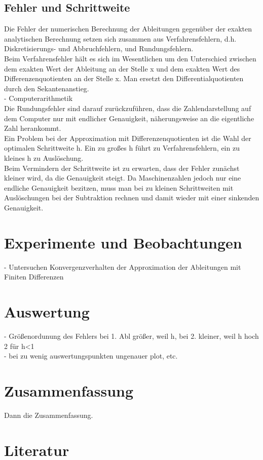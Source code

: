 \documentclass{scrartcl}
\begin{document}
\subsection{Fehler und Schrittweite}
\label{ssec:schrittweite}
Die Fehler der numerischen Berechnung der Ableitungen gegenüber der exakten analytischen Berechnung setzen sich zusammen aus Verfahrensfehlern, d.h. Diskretisierungs- und Abbruchfehlern, und Rundungsfehlern.\\
Beim Verfahrensfehler hält es sich im Wesentlichen um den Unterschied zwischen dem exakten Wert der Ableitung an der Stelle x und dem exakten Wert des Differenzenquotienten an der Stelle x. Man ersetzt den Differentialquotienten durch den Sekantenanstieg.\\
- Computerarithmetik\\
Die Rundungsfehler sind darauf zurückzuführen, dass die Zahlendarstellung auf dem Computer nur mit endlicher Genauigkeit, näherungsweise an die eigentliche Zahl herankommt. \\

Ein Problem bei der Approximation mit Differenzenquotienten ist die Wahl der optimalen Schrittweite h. Ein zu großes h führt zu Verfahrensfehlern, ein zu kleines h zu Auslöschung.\\
Beim Vermindern der Schrittweite ist zu erwarten, dass der Fehler zunächst kleiner wird, da die Genauigkeit steigt. Da Maschinenzahlen jedoch nur eine endliche Genauigkeit bezitzen, muss man bei zu kleinen Schrittweiten mit Auslöschungen bei der Subtraktion rechnen und damit wieder mit einer sinkenden Genauigkeit. \\

\pagebreak \section{Experimente und Beobachtungen}
\label{sec:experimente}
- Untersuchen Konvergenzverhalten der Approximation der Ableitungen mit Finiten Differenzen\\

\pagebreak \section{Auswertung}
\label{sec:auswertung}
- Größenordunung des Fehlers bei 1. Abl größer, weil h, bei 2. kleiner, weil h hoch 2 für h<1\\
- bei zu wenig auswertungspunkten ungenauer plot, etc.\\

\pagebreak \section{Zusammenfassung}
\label{sec:zusammenfassung}
Dann die Zusammenfassung.

\pagebreak \section{Literatur}
\label{sec:literatur}
\end{document}
